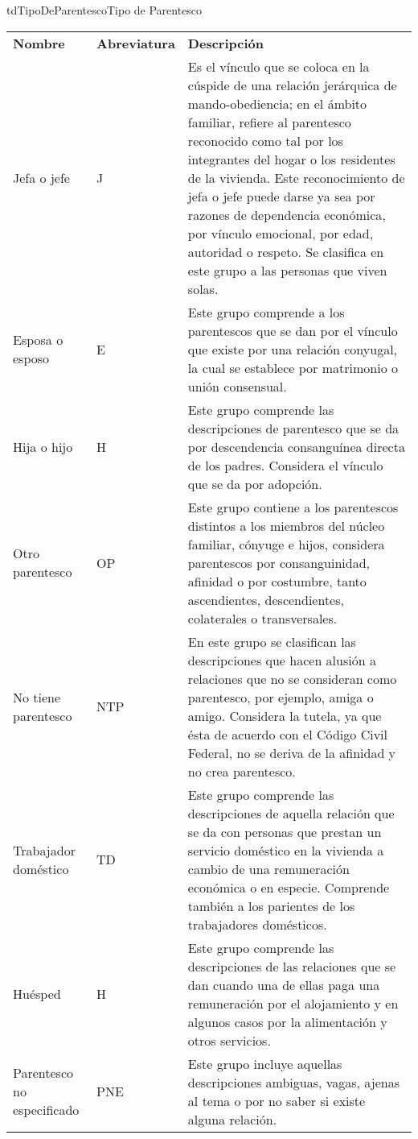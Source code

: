 \begin{TipoDeDato}{tdTipoDeParentesco}{Tipo de Parentesco}
		\begin{longtable}{| p{}| p{}|p{}|}
	 			\rowcolor{colorPrincipal}
	 			\multicolumn{3}{|c|}{\bf \color{white} Valores Iniciales}\\
	 			\hline
	 			\rowcolor{colorSecundario}
	 			\bf \color{white} Nombre & \bf \color{white} Abreviatura & \bf\color{white} Descripción\\
	 			\hline
	 			Jefa o jefe & J & Es el vínculo que se coloca en la cúspide de una relación jerárquica de mando-obediencia; en el ámbito familiar, refiere al parentesco reconocido como tal por los integrantes del hogar o los residentes de la vivienda. Este reconocimiento de jefa o jefe puede darse ya sea por razones de dependencia económica, por vínculo emocional, por edad, autoridad o respeto. Se clasifica en este grupo a las personas que viven solas.\\
	 			\hline
	 			Esposa o esposo & E & Este grupo comprende a los parentescos que se dan por el vínculo que existe por una relación conyugal, la cual se establece por matrimonio o unión consensual.\\
	 			\hline
	 			Hija o hijo & H & 	Este grupo comprende las descripciones de parentesco que se da por descendencia consanguínea directa de los padres. Considera el vínculo que se da por adopción.\\
	 			\hline
	 			Otro parentesco & OP & Este grupo contiene a los parentescos distintos a los miembros del núcleo familiar, cónyuge e hijos, considera parentescos por consanguinidad, afinidad o por costumbre, tanto ascendientes, descendientes, colaterales o transversales. \\
	 			\hline
	 			No tiene parentesco & NTP & En este grupo se clasifican las descripciones que hacen alusión a relaciones que no se consideran como parentesco, por ejemplo, amiga o amigo. Considera la tutela, ya que ésta de acuerdo con el Código Civil Federal, no se deriva de la afinidad y no crea parentesco.  \\
	 			\hline
	 			Trabajador doméstico & TD & Este grupo comprende las descripciones de aquella relación que se da con personas que prestan un servicio doméstico en la vivienda a cambio de una remuneración económica o en especie. Comprende también a los parientes de los trabajadores domésticos.\\
	 			\hline
	 			Huésped & H & Este grupo comprende las descripciones de las relaciones que se dan cuando una de ellas paga una remuneración por el alojamiento y en algunos casos por la alimentación y otros servicios.\\
	 			\hline
	 			Parentesco no especificado & PNE & Este grupo incluye aquellas descripciones ambiguas, vagas, ajenas al tema o por no saber si existe alguna relación.\\
	 			\hline
	 		\end{longtable}
	\end{TipoDeDato}
	
